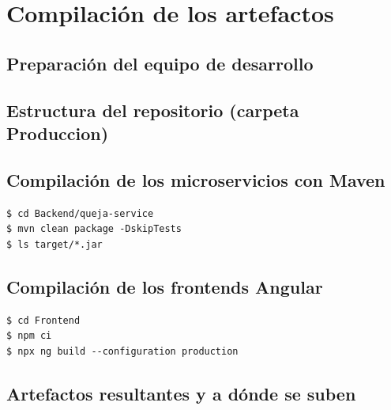 \section{Compilación de los artefactos}

\subsection{Preparación del equipo de desarrollo}

\subsection{Estructura del repositorio (carpeta Produccion)}

\subsection{Compilación de los microservicios con Maven}
\begin{lstlisting}
$ cd Backend/queja-service
$ mvn clean package -DskipTests
$ ls target/*.jar
\end{lstlisting}

\subsection{Compilación de los frontends Angular}
\begin{lstlisting}
$ cd Frontend
$ npm ci
$ npx ng build --configuration production
\end{lstlisting}

\subsection{Artefactos resultantes y a dónde se suben}
